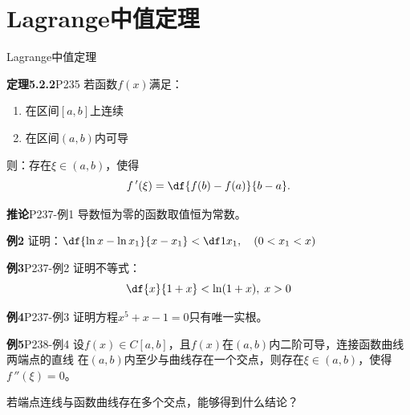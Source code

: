 \section{Lagrange中值定理}

\begin{frame}{Lagrange中值定理}
	\linespread{1.2}\pause 
	\begin{block}{{\bf 定理5.2.2}\hfill P235}
		若函数$f(x)$满足：\pause 
		\begin{enumerate}
		  \item 在区间$[a,b]$上连续\pause 
		  \item 在区间$(a,b)$内可导\pause 
		\end{enumerate}
		则：存在$\xi\in(a,b)$，使得\pause 
		$$f\,'(\xi)=\df{f(b)-f(a)}{b-a}.$$
	\end{block}
\end{frame}

\begin{frame}%
	\linespread{1.2}\pause 
	\begin{block}{{\bf 推论}\hfill P237-例1}
		导数恒为零的函数取值恒为常数。
	\end{block}
	\bigskip
	\pause 
	\begin{exampleblock}{{\bf 例2}\hfill}
		证明：$\df{\ln x-\ln x_1}{x-x_1}<\df 1{x_1},\quad (0<x_1<x)$
	\end{exampleblock}
	\pause 
	\begin{exampleblock}{{\bf 例3}\hfill P237-例2}
		证明不等式：
		$$\df{x}{1+x}<\ln(1+x),\;x>0$$
	\end{exampleblock}
\end{frame}

\begin{frame}
	\linespread{1.5}
	\begin{exampleblock}{{\bf 例4}\hfill P237-例3}
		证明方程$x^5+x-1=0$只有唯一实根。
	\end{exampleblock}
	\bigskip
	\pause 
	\begin{exampleblock}{{\bf 例5}\hfill P238-例4}
		设$f(x)\in C[a,b]$，且$f(x)$在$(a,b)$内二阶可导，连接函数曲线两端点的直线
		在$(a,b)$内至少与曲线存在一个交点，则存在$\xi\in(a,b)$，使得$f\,''(\xi)=0$。
	\end{exampleblock}
	\pause
	{}若端点连线与函数曲线存在多个交点，能够得到什么结论？
\end{frame}


